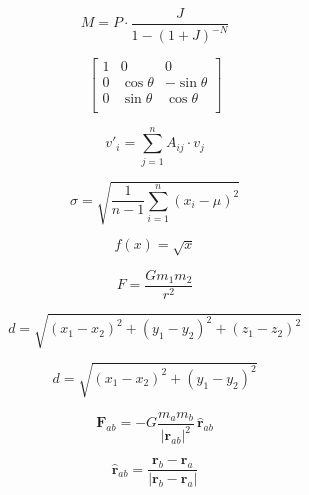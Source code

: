 \documentclass[12pt]{article}
\begin{document}
$$
M = P \cdot \frac{J}{1 - (1 + J)^{-N}}
$$



$$
\begin{bmatrix}
1 & 0 & 0 \\
0 & \cos \theta & -\sin \theta \\
0 & \sin \theta  & \cos \theta \\
\end{bmatrix}
$$

$$
v'_i = \sum_{j = 1}^n A_{ij}\cdot v_j
$$

$$
\sigma = \sqrt{\frac{1}{n - 1}\sum_{i = 1}^n (x_i - \mu)^2}
$$

$$
f(x) = \sqrt{x}
$$

$$
F = \frac{Gm_1m_2}{r^2}
$$

$$
d = \sqrt{(x_1 - x_2)^2 + (y_1 - y_2)^2 + (z_1 -  z_2)^2}
$$

$$
d = \sqrt{(x_1 - x_2)^2+(y_1 - y_2)^2}
$$

$$
\mathbf{F}_{ab} = - G \frac{m_a m_b}{{\vert \mathbf{r}_{ab} \vert}^2} \, \mathbf{\hat{r}}_{ab}
$$

$$
\mathbf{\hat{r}}_{ab} = \frac{\mathbf{r}_b - \mathbf{r}_a}{\vert\mathbf{r}_b - \mathbf{r}_a\vert}
$$
\end{document}
